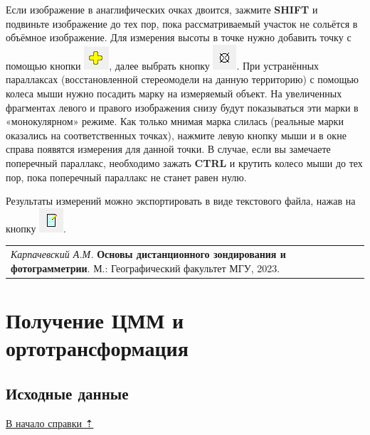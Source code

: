 \documentclass[
  12pt,
]{book}
\begin{document}
Если изображение в анаглифических очках двоится, зажмите \textbf{SHIFT} и подвиньте изображение до тех пор, пока рассматриваемый участок не сольётся в объёмное изображение. Для измерения высоты в точке нужно добавить точку с помощью кнопки \includegraphics{images/Ref13/Add_Point.png}, далее выбрать кнопку \includegraphics{images/Ref13/Measure.png}. При устранённых параллаксах (восстановленной стереомодели на данную территорию) с помощью колеса мыши нужно посадить марку на измеряемый объект. На увеличенных фрагментах левого и правого изображения снизу будут показываться эти марки в «монокулярном» режиме. Как только мнимая марка слилась (реальные марки оказались на соответственных точках), нажмите левую кнопку мыши и в окне справа появятся измерения для данной точки. В случае, если вы замечаете поперечный параллакс, необходимо зажать \textbf{CTRL} и крутить колесо мыши до тех пор, пока поперечный параллакс не станет равен нулю.

Результаты измерений можно экспортировать в виде текстового файла, нажав на кнопку \includegraphics{images/Ref13/Export.png}.

\begin{longtable}[]{@{}l@{}}
\toprule\noalign{}
\endhead
\bottomrule\noalign{}
\endlastfoot
\emph{Карпачевский А.М.} \textbf{Основы дистанционного зондирования и фотограмметрии}. М.: Географический факультет МГУ, 2023. \\
\end{longtable}

\hypertarget{dem}{%
\chapter{Получение ЦММ и ортотрансформация}\label{dem}}

\hypertarget{dem-initial}{%
\section{Исходные данные}\label{dem-initial}}

\protect\hyperlink{dem}{В начало справки ⇡}
\end{document}
